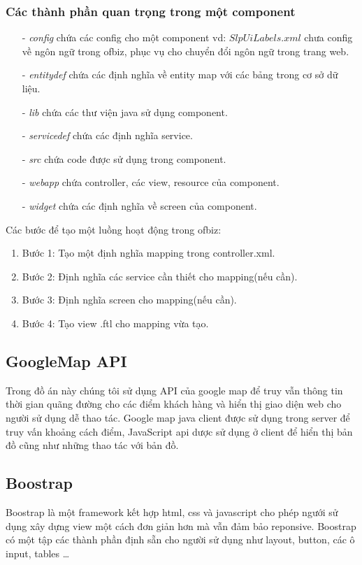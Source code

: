 \documentclass[a4paper,12pt]{report}
\begin{document}
\subsubsection{Các thành phần quan trọng trong một component}
\begin{itemize}
\item[-] \textit{config} chứa các config cho một component vd: $SlpUiLabels.xml$ chưa config về ngôn ngữ trong ofbiz, phục vụ cho chuyển đổi ngôn ngữ trong trang web.
\item[-] \textit{entitydef} chứa các định nghĩa về entity map với các bảng trong cơ sở dữ liệu.
\item[-] \textit{lib} chứa các thư viện java sử dụng component.
\item[-] \textit{servicedef} chứa các định nghĩa service.
\item[-] \textit{src} chứa code được sử dụng trong component.
\item[-] \textit{webapp} chứa controller, các view, resource của component.
\item[-] \textit{widget} chứa các định nghĩa về screen của component.
\end{itemize}
Các bước để tạo một luồng hoạt động trong ofbiz:
\begin{enumerate}
\item Bước 1: Tạo một định nghĩa mapping trong controller.xml.
\item Bước 2: Định nghĩa các service cần thiết cho mapping(nếu cần).
\item Bước 3: Định nghĩa screen cho mapping(nếu cần).
\item Bước 4: Tạo view .ftl cho mapping vừa tạo.
\end{enumerate}
\subsection{GoogleMap API}
Trong đồ án này chúng tôi sử dụng API của google map để truy vẫn thông tin thời gian quãng đường cho các điểm khách hàng và hiển thị giao diện web cho người sử dụng dễ thao tác. Google map java client được sử dụng trong server để truy vấn khoảng cách điểm, JavaScript api dược sử dụng ở client để hiển thị bản đồ cũng như những thao tác với bản đồ.
\subsection{Boostrap}
Boostrap là một framework kết hợp html, css và javascript cho phép ngưới sử dụng xây dựng view một cách đơn giản hơn mà vẫn đảm bảo reponsive. Boostrap có một tập các thành phần định sẵn cho người sử dụng như layout, button, các ô input, tables \ldots
\end{document}
